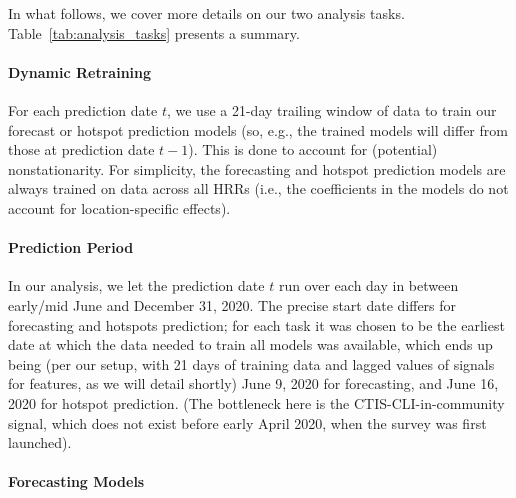 \documentclass[9pt,twocolumn,twoside,lineno]{pnas-new}
\begin{document}
In what follows, we cover more details on our two analysis
tasks. Table~\ref{tab:analysis_tasks} presents a summary.   

\paragraph{Dynamic Retraining}

For each prediction date $t$, we use a 21-day trailing window of data to train
our forecast or hotspot prediction models (so, e.g., the trained models will
differ from those at prediction date $t-1$).  This is done to account for
(potential) nonstationarity.  For simplicity, the forecasting and hotspot
prediction models are always trained on data across all HRRs (i.e., the
coefficients in the models do not account for location-specific effects).   

\paragraph{Prediction Period}

In our analysis, we let the prediction date $t$ run over each day in between
early/mid June and December 31, 2020.  The precise start date differs for 
forecasting and hotspots prediction; for each task it was chosen to be the
earliest date at which the data needed to train all models was available, which
ends up being (per our setup, with 21 days of training data and lagged values 
of signals for features, as we will detail shortly) June 9, 2020 for
forecasting, and June 16, 2020 for hotspot prediction. (The bottleneck here is
the CTIS-CLI-in-community signal, which does not exist before early April 2020,
when the survey was first launched). 

\paragraph{Forecasting Models}
\end{document}
